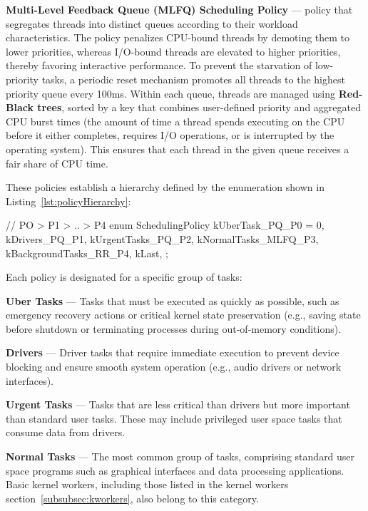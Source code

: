 \documentclass[a4paper,10pt,twoside]{report}
\theoremstyle{definition}
\begin{document}
\textbf{Multi-Level Feedback Queue (MLFQ) Scheduling Policy} --- policy that segregates threads into distinct queues according to their workload characteristics. The policy penalizes CPU-bound threads by demoting them to lower priorities, whereas I/O-bound threads are elevated to higher priorities, thereby favoring interactive performance. To prevent the starvation of low-priority tasks, a periodic reset mechanism promotes all threads to the highest priority queue every 100ms. Within each queue, threads are managed using \textbf{Red-Black trees}, sorted by a key that combines user-defined priority and aggregated CPU burst times (the amount of time a thread spends executing on the CPU before it either completes, requires I/O operations, or is interrupted by the operating system). This ensures that each thread in the given queue receives a fair share of CPU time.

\noindent These policies establish a hierarchy defined by the enumeration shown in Listing~\ref{lst:policyHierarchy}:

\clearpage

\begin{cppcode}[caption={Scheduling Policy Hierarchy}, label={lst:policyHierarchy}]
// PO > P1 > .. > P4
enum SchedulingPolicy {
    kUberTask_PQ_P0 = 0,
    kDrivers_PQ_P1,
    kUrgentTasks_PQ_P2,
    kNormalTasks_MLFQ_P3,
    kBackgroundTasks_RR_P4,
    kLast,
};
\end{cppcode}

Each policy is designated for a specific group of tasks:

\textbf{Uber Tasks} --- Tasks that must be executed as quickly as possible, such as emergency recovery actions or critical kernel state preservation (e.g., saving state before shutdown or terminating processes during out-of-memory conditions).

\textbf{Drivers} --- Driver tasks that require immediate execution to prevent device blocking and ensure smooth system operation (e.g., audio drivers or network interfaces).

\textbf{Urgent Tasks} --- Tasks that are less critical than drivers but more important than standard user tasks. These may include privileged user space tasks that consume data from drivers.

\textbf{Normal Tasks} --- The most common group of tasks, comprising standard user space programs such as graphical interfaces and data processing applications. Basic kernel workers, including those listed in the kernel workers section~\ref{subsubsec:kworkers}, also belong to this category.
\end{document}
